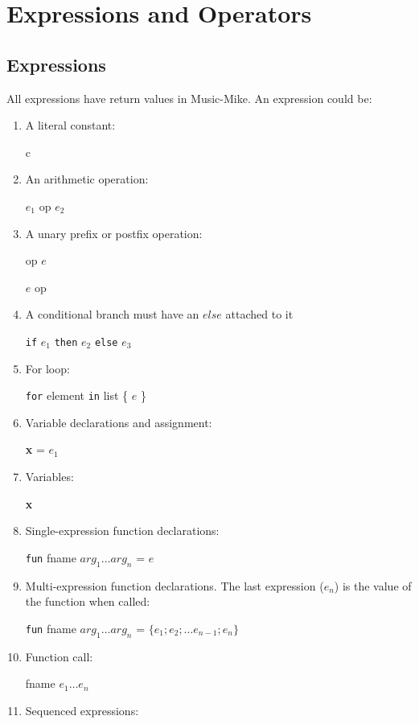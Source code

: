 \documentclass[12pt]{report}
\begin{document}
\section{Expressions and Operators}
\subsection{Expressions}

All expressions have return values in Music-Mike. An expression could be:
\begin{enumerate}
\item A literal constant: 

c
\item An arithmetic operation: 

$e_1$ op $e_2$
\item A unary prefix or postfix operation: 

op $e$ 

$e$ op
\item A conditional branch must have an $else$ attached to it

\texttt{if} $e_1$ \texttt{then} $e_2$ \texttt{else} $e_3$


\item For loop:

\texttt{for} element \texttt{in} list \{ $e$ \}

\item Variable declarations and assignment:

\textbf{x} = $e_1$

\item Variables:

\textbf{x}

\item Single-expression function declarations:

\texttt{fun} fname $arg_1 \ldots arg_n$ = $e$
\item Multi-expression function declarations.  The last expression ($e_n$) is the value of the function when called: 

\texttt{fun} fname $arg_1 \ldots arg_n$ = $\{ e_1; e_2; \ldots e_{n-1}; e_n \}$


\item Function call: 

fname $e_1 \ldots e_n$
\item Sequenced expressions: 


\end{enumerate}
\end{document}
